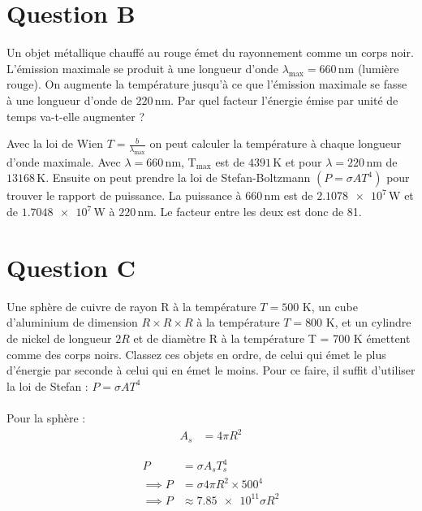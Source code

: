 \documentclass[11pt, letterpaper]{article}
\begin{document}
\section*{Question B}

Un objet métallique chauffé au rouge émet du rayonnement comme un corps noir. L’émission maximale se produit à une longueur d’onde $\lambda_{\text{max}} = 660\,$nm (lumière rouge). On augmente la température jusqu’à ce que l’émission
maximale se fasse à une longueur d’onde de $220\,$nm. Par quel facteur l’énergie émise par unité de temps va-t-elle augmenter ?
\\
\begin{tcolorbox}[tommy]
    Avec la loi de Wien $T=\frac{b}{\lambda_\text{max}}$ on peut calculer la température à chaque longueur d'onde maximale. Avec
    $\lambda=660\,$nm, T$_\text{max}$ est de $\num{4391}\,$K et pour $\lambda=220\,$nm de
    $\num{13168}\,$K. Ensuite on peut prendre la loi de Stefan-Boltzmann $(P=\sigma A T^4)$ pour trouver le rapport de puissance. La puissance à $660\,$nm est de $\num{2.1078e7}\,$W et de $\num{1.7048e7}\,$W à $220\,$nm. Le facteur entre les deux est donc de 81.
\end{tcolorbox}
\vspace{1cm}

\section*{Question C}

Une sphère de cuivre de rayon R à la température $T = 500$ K, un cube
d’aluminium de dimension $R\times R \times R$ à la température $T = 800$ K, et
un cylindre de nickel de longueur $2R$ et de diamètre R à la température T =
700 K émettent comme des corps noirs. Classez ces objets en ordre, de celui qui
émet le plus d’énergie par seconde à celui qui en émet le moins. 
\newpage
Pour ce faire, il suffit d'utiliser la loi de Stefan : $P = \sigma A T^{4}$
\\\\

Pour la sphère : \\

\begin{align*}
    A_s & = 4 \pi R^2
\end{align*}

\begin{align*}
    P          & = \sigma A_s T_s^{4}             \\
    \implies P & = \sigma 4 \pi R^2  \times 500^4 \\
    \implies P & \approx \num{7.85e11} \sigma R^2
\end{align*}
\end{document}
